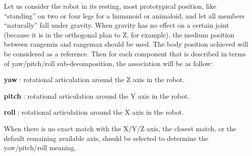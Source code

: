 \documentclass[a4paper]{article}
\begin{document}
{\sffamily
Let us consider the robot in its resting, most prototypical position,
like “standing” on two or four legs for a humanoid or animaloid, and
let all members “naturally” fall under gravity. When gravity has no
effect on a certain joint (because it is in the orthogonal plan to Z,
for example), the medium position between rangemin and rangemax should
be used. The body position achieved will be considered as a reference.
Then for each component that is described in terms of yaw/pitch/roll
sub-decomposition, the association will be as follow:}

{
\textsf{\textbf{ yaw}}\textsf{ : rotational articulation around the Z
axis in the robot.}}

{\sffamily
\textbf{ pitch} : rotational articulation around the Y axis in the
robot.}

{\sffamily
\textbf{ roll} : rotational articulation around the X axis in the
robot.}

{\sffamily
When there is no exact match with the X/Y/Z axis, the closest match, or
the default remaining available axis, should be selected to determine
the yaw/pitch/roll meaning. }
\end{document}

